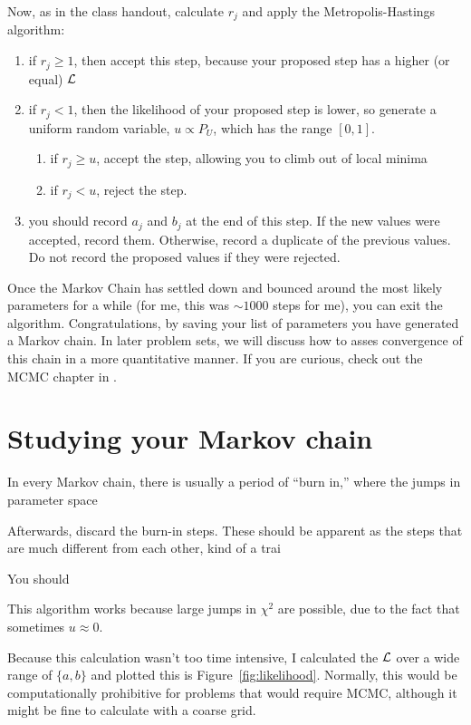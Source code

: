 \documentclass[iop,floatfix]{emulateapj}
\begin{document}
Now, as in the class handout, calculate $r_j$ and apply the Metropolis-Hastings algorithm:
\begin{enumerate}
  \item if $r_j \geq 1$, then accept this step, because your proposed step has a higher (or equal) ${\cal L}$
  \item if $r_j < 1$, then the likelihood of your proposed step is lower, so generate a uniform random variable, $u \propto P_U$, which has the range $[0,1]$.
    \begin{enumerate}
      \item if $r_j \geq u$, accept the step, allowing you to climb out of local minima
      \item if $r_j < u$, reject the step. 
    \end{enumerate}
  \item you should record $a_j$ and $b_j$ at the end of this step. If the new values were accepted, record them. Otherwise, record a duplicate of the previous values. Do not record the proposed values if they were rejected.
\end{enumerate}

Once the Markov Chain has settled down and bounced around the most likely parameters for a while (for me, this was $\sim 1000$ steps for me), you can exit the algorithm. Congratulations, by saving your list of parameters you have generated a Markov chain. In later problem sets, we will discuss how to asses convergence of this chain in a more quantitative manner. If you are curious, check out the MCMC chapter in \citet{gcs+04}.

\section{Studying your Markov chain}

In every Markov chain, there is usually a period of ``burn in,'' where the jumps in parameter space 

Afterwards, discard the burn-in steps. These should be apparent as the steps that are much different from each other, kind of a trai

You should 

This algorithm works because large jumps in $\chi^2$ are possible, due to the fact that sometimes $u \approx 0$.

Because this calculation wasn't too time intensive, I calculated the ${\cal L}$ over a wide range of $\{a,b\}$ and plotted this is Figure~\ref{fig:likelihood}. Normally, this would be computationally prohibitive for problems that would require MCMC, although it might be fine to calculate with a coarse grid.
\end{document}
